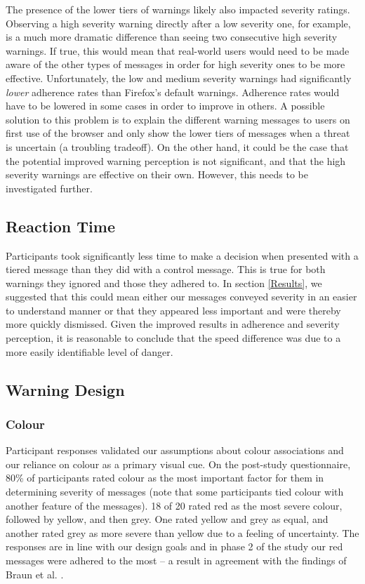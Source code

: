 The presence of the lower tiers of warnings likely also impacted severity ratings. Observing a high severity warning directly after a low severity one, for example, is a much more dramatic difference than seeing two consecutive high severity warnings. If true, this would mean that real-world users would need to be made aware of the other types of messages in order for high severity ones to be more effective. Unfortunately, the low and medium severity warnings had significantly \emph{lower} adherence rates than Firefox's default warnings. Adherence rates would have to be lowered in some cases in order to improve in others. A possible solution to this problem is to explain the different warning messages to users on first use of the browser and only show the lower tiers of messages when a threat is uncertain (a troubling tradeoff). On the other hand, it could be the case that the potential improved warning perception is not significant, and that the high severity warnings are effective on their own. However, this needs to be investigated further.

\subsection{Reaction Time}
Participants took significantly less time to make a decision when presented with a tiered message than they did with a control message. This is true for both warnings they ignored and those they adhered to. In section \ref{Results}, we suggested that this could mean either our messages conveyed severity in an easier to understand manner or that they appeared less important and were thereby more quickly dismissed. Given the improved results in adherence and severity perception, it is reasonable to conclude that the speed difference was due to a more easily identifiable level of danger.

\subsection{Warning Design}
\subsubsection{Colour}
Participant responses validated our assumptions about colour associations and our reliance on colour as a primary visual cue. On the post-study questionnaire, 80\% of participants rated colour as the most important factor for them in determining severity of messages (note that some participants tied colour with another feature of the messages). 18 of 20 rated red as the most severe colour, followed by yellow, and then grey. One rated yellow and grey as equal, and another rated grey as more severe than yellow due to a feeling of uncertainty. The responses are in line with our design goals and in phase 2 of the study our red messages were adhered to the most -- a result in agreement with the findings of Braun et al. \cite{braun1994color}.

